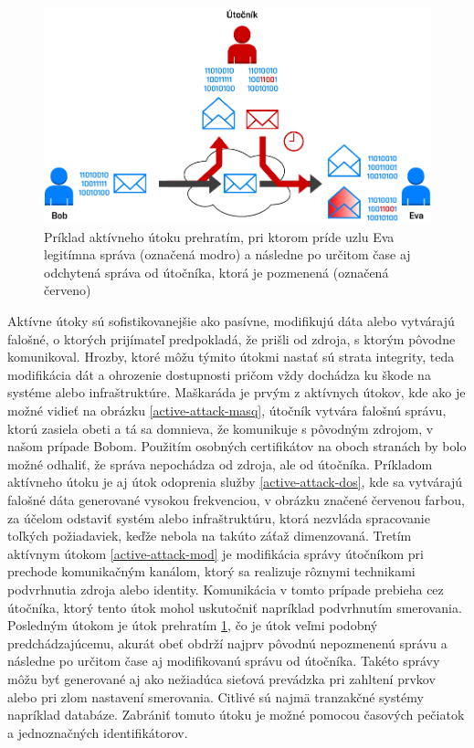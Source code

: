 \begin{figure}[H]
	\begin{center}
		\includegraphics[scale=0.55]{obrazky/active-attack-reply.pdf}
	\end{center}
	\caption[Aktívny útok prehratím]{Príklad aktívneho útoku prehratím, pri ktorom príde uzlu Eva legitímna správa (označená modro) a následne po určitom čase aj odchytená správa od útočníka, ktorá je pozmenená (označená červeno) \cite{Stallings2011}}
	\label{active-attack-reply}
\end{figure}


Aktívne útoky sú sofistikovanejšie ako pasívne, modifikujú dáta alebo vytvárajú falošné, o ktorých prijímateľ predpokladá, že prišli od zdroja, s ktorým pôvodne komunikoval. Hrozby, ktoré môžu týmito útokmi nastať sú strata integrity, teda modifikácia dát a ohrozenie dostupnosti pričom vždy dochádza ku škode na systéme alebo infraštruktúre. Maškaráda je prvým z aktívnych útokov, kde ako je možné vidieť na obrázku \ref{active-attack-masq}, útočník vytvára falošnú správu, ktorú zasiela obeti a tá sa domnieva, že komunikuje s pôvodným zdrojom, v našom prípade Bobom. Použitím osobných certifikátov na oboch stranách by bolo možné odhaliť, že správa nepochádza od zdroja, ale od útočníka. Príkladom aktívneho útoku je aj útok odoprenia služby \ref{active-attack-dos}, kde sa vytvárajú falošné dáta generované vysokou frekvenciou, v obrázku značené červenou farbou, za účelom odstaviť systém alebo infraštruktúru, ktorá nezvláda spracovanie toľkých požiadaviek, keďže nebola na takúto záťaž dimenzovaná. Tretím aktívnym útokom \ref{active-attack-mod} je modifikácia správy útočníkom pri prechode komunikačným kanálom, ktorý sa realizuje rôznymi technikami podvrhnutia zdroja alebo identity. Komunikácia v tomto prípade prebieha cez útočníka, ktorý tento útok mohol uskutočniť napríklad podvrhnutím smerovania. Posledným útokom je útok prehratím \ref{active-attack-reply}, čo je útok veľmi podobný predchádzajúcemu, akurát obeť obdrží najprv pôvodnú nepozmenenú správu a následne po určitom čase aj modifikovanú správu od útočníka. Takéto správy môžu byť generované aj ako nežiadúca sieťová prevádzka pri zahltení prvkov alebo pri zlom nastavení smerovania. Citlivé sú najmä tranzakčné systémy napríklad databáze. Zabrániť tomuto útoku je možné pomocou časových pečiatok a jednoznačných identifikátorov. 




